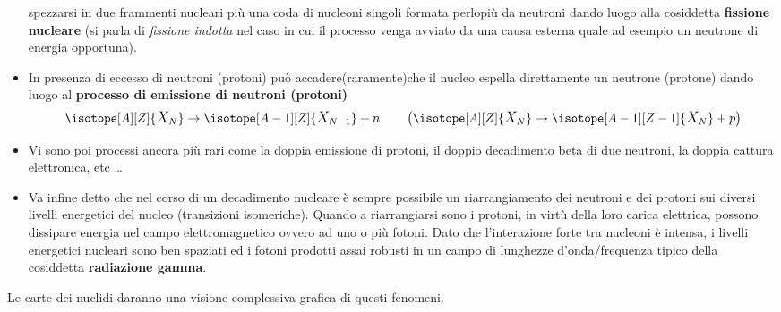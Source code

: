 \begin{itemize}
    spezzarsi in due frammenti nucleari più una coda di nucleoni singoli formata perlopiù da neutroni dando luogo alla
    cosiddetta \textbf{fissione nucleare} (si parla di \emph{fissione indotta} nel caso in cui il processo venga avviato
    da una causa esterna quale ad esempio un neutrone di energia opportuna).
    \item  In presenza di eccesso di neutroni (protoni) può accadere(raramente)che il nucleo espella direttamente un
    neutrone (protone) dando luogo al \textbf{processo di emissione di neutroni (protoni)}
    \[
       \isotope[A][Z]{\mathlarger{X}_{N}} \to \isotope[A-1][Z]{\mathlarger{X}_{N-1}} + n \qquad
      \left(    \isotope[A][Z]{\mathlarger{X}_{N}} \to \isotope[A-1][Z-1]{\mathlarger{X}_{N}} + p    \right)
    \]
    \item Vi sono poi processi ancora più rari come la doppia emissione di protoni, il doppio decadimento beta
    di due neutroni, la doppia cattura elettronica, etc \ldots
    \item Va infine detto che nel corso di un decadimento nucleare è sempre possibile un riarrangiamento dei neutroni
    e dei protoni sui diversi livelli energetici del nucleo (transizioni isomeriche).
    Quando a riarrangiarsi sono i protoni, in virtù della loro carica elettrica, possono dissipare energia nel campo
    elettromagnetico ovvero ad uno o più fotoni.
    Dato che l’interazione forte tra nucleoni è intensa, i livelli energetici nucleari sono ben spaziati ed i fotoni
    prodotti assai robusti in un campo di lunghezze d’onda/frequenza tipico della cosiddetta \textbf{radiazione gamma}.
\end{itemize}

Le carte dei nuclidi daranno una visione complessiva grafica di questi fenomeni.
